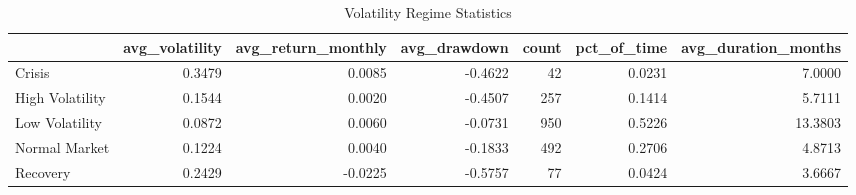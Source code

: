 \begin{table}
\caption{Volatility Regime Statistics}
\label{tab:regime_stats}
\begin{tabular}{lrrrrrr}
\toprule
 & avg_volatility & avg_return_monthly & avg_drawdown & count & pct_of_time & avg_duration_months \\
\midrule
Crisis & 0.3479 & 0.0085 & -0.4622 & 42 & 0.0231 & 7.0000 \\
High Volatility & 0.1544 & 0.0020 & -0.4507 & 257 & 0.1414 & 5.7111 \\
Low Volatility & 0.0872 & 0.0060 & -0.0731 & 950 & 0.5226 & 13.3803 \\
Normal Market & 0.1224 & 0.0040 & -0.1833 & 492 & 0.2706 & 4.8713 \\
Recovery & 0.2429 & -0.0225 & -0.5757 & 77 & 0.0424 & 3.6667 \\
\bottomrule
\end{tabular}
\end{table}
